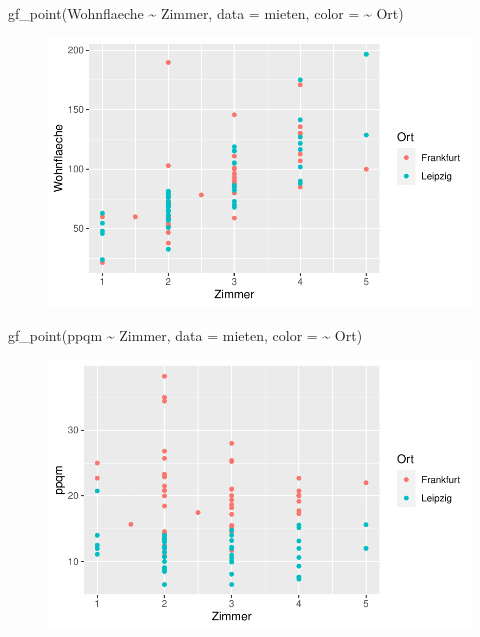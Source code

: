 \documentclass[
  a4paper,
  DIV=11]{scrartcl}
\newenvironment{Shaded}{\begin{snugshade}}{\end{snugshade}}
\newcommand{\AttributeTok}[1]{\textcolor[rgb]{0.40,0.45,0.13}{#1}}
\newcommand{\FunctionTok}[1]{\textcolor[rgb]{0.28,0.35,0.67}{#1}}
\newcommand{\NormalTok}[1]{\textcolor[rgb]{0.00,0.23,0.31}{#1}}
\newcommand{\SpecialCharTok}[1]{\textcolor[rgb]{0.37,0.37,0.37}{#1}}
\begin{document}
\begin{Shaded}
\begin{Highlighting}[]
\FunctionTok{gf\_point}\NormalTok{(Wohnflaeche }\SpecialCharTok{\textasciitilde{}}\NormalTok{ Zimmer, }\AttributeTok{data =}\NormalTok{ mieten, }\AttributeTok{color =} \SpecialCharTok{\textasciitilde{}}\NormalTok{ Ort)}
\end{Highlighting}
\end{Shaded}

\begin{figure}[H]

{\centering \includegraphics{Mietmodellierung_files/figure-pdf/unnamed-chunk-14-2.pdf}

}

\end{figure}

\begin{Shaded}
\begin{Highlighting}[]
\FunctionTok{gf\_point}\NormalTok{(ppqm }\SpecialCharTok{\textasciitilde{}}\NormalTok{ Zimmer, }\AttributeTok{data =}\NormalTok{ mieten, }\AttributeTok{color =} \SpecialCharTok{\textasciitilde{}}\NormalTok{ Ort)}
\end{Highlighting}
\end{Shaded}

\begin{figure}[H]

{\centering \includegraphics{Mietmodellierung_files/figure-pdf/unnamed-chunk-14-3.pdf}

}

\end{figure}
\end{document}
